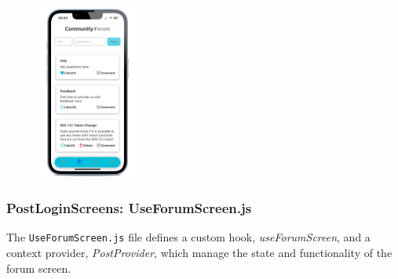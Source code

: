 \begin{figure}[!ht]
    \centering
    \includegraphics[width=0.3\textwidth]
    {LATEX/Appendices/Images/Software/Frontend/forum_screen_2.png}
    \label{fig:forum screen}
\end{figure} 

\newpage
\subsubsection{PostLoginScreens: UseForumScreen.js}

The \texttt{UseForumScreen.js} file defines a custom hook, \textit{useForumScreen}, and a context provider, \textit{PostProvider}, which manage the state and functionality of the forum screen.

